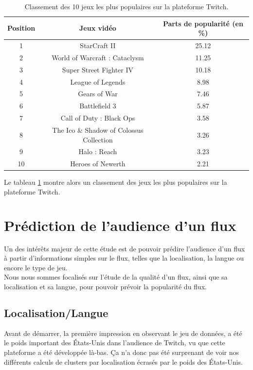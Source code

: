 \documentclass[11pt, a4paper, titlepage]{scrartcl}
\begin{document}
\begin{table}[h]
  \centering
   \caption{\label{tab:games_rank} Classement des 10 jeux les plus populaires
   sur la plateforme Twitch.}
   \begin{tabular}{|c|c|c|}
     \hline
     Position & Jeux vidéo & Parts de popularité (en \%) \\
     \hline
     1 & StarCraft II & 25.12 \\
     2 & World of Warcraft : Cataclysm & 11.25 \\
     3 & Super Street Fighter IV & 10.18 \\
     4 & League of Legends & 8.98 \\
     5 & Gears of War & 7.46 \\
     6 & Battlefield 3 & 5.87 \\
     7 & Call of Duty : Black Ops & 3.58 \\
     8 & The Ico \& Shadow of Colossus Collection & 3.26 \\
     9 & Halo : Reach & 3.23 \\
     10 & Heroes of Newerth & 2.21 \\
     \hline
   \end{tabular}
\end{table}

Le tableau \ref{tab:games_rank} montre alors un classement des jeux les plus
populaires sur la plateforme Twitch.

\section{Prédiction de l'audience d'un flux}

Un des intérêts majeur de cette étude est de pouvoir prédire l'audience d'un
flux à partir d'informations simples sur le flux, telles que la localisation,
la langue ou encore le type de jeu. \\

Nous nous sommes focalisés sur l'étude de la qualité d'un flux, ainsi que sa
localisation et sa langue, pour pouvoir prévoir la popularité du flux.

\subsection{Localisation/Langue}

Avant de démarrer, la première impression en observant le jeu de données, a été
le poids important des États-Unis dans l'audience de Twitch, vu que cette
plateforme a été développée là-bas. Ça n'a donc pas été surprenant de voir nos
différents calculs de clusters par localisation écrasés par le poids des
États-Unis. \\
\end{document}
